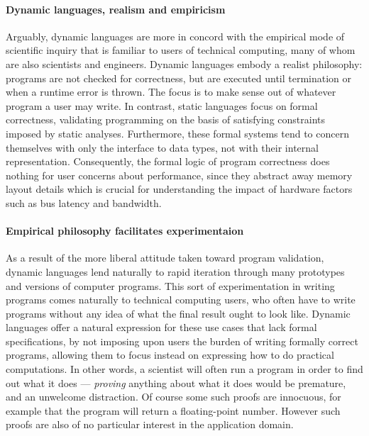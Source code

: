 \documentclass[pldi]{sigplanconf-pldi15}
\begin{document}
\paragraph{Dynamic languages, realism and empiricism}
Arguably, dynamic languages are more in concord with the empirical mode of
scientific inquiry that is familiar to users of technical computing, many of
whom are also scientists and engineers.  Dynamic languages embody a realist
philosophy: programs are not checked for correctness, but are executed until
termination or when a runtime error is thrown.  The focus is to make sense out
of whatever program a user may write.  In contrast, static languages focus on
formal correctness, validating programming on the basis of satisfying
constraints imposed by static analyses.  Furthermore, these formal systems tend
to concern themselves with only the interface to data types, not with their
internal representation.  Consequently, the formal logic of program correctness
does nothing for user concerns about performance, since they abstract away
memory layout details which is crucial for understanding the impact of hardware
factors such as bus latency and bandwidth.

\paragraph{Empirical philosophy facilitates experimentaion}
As a result of the more liberal attitude taken toward program validation,
dynamic languages lend naturally to rapid iteration through many prototypes and
versions of computer programs.  This sort of experimentation in writing
programs comes naturally to technical computing users, who often have to write
programs without any idea of what the final result ought to look like.  Dynamic
languages offer a natural expression for these use cases that lack formal
specifications, by not imposing upon users the burden of writing formally
correct programs, allowing them to focus instead on expressing how to do
practical computations.  In other words, a scientist will often run a program
in order to find out what it does --- \emph{proving} anything about what it
does would be premature, and an unwelcome distraction.  Of course some such
proofs are innocuous, for example that the program will return a floating-point
number.  However such proofs are also of no particular interest in the
application domain.
\end{document}
